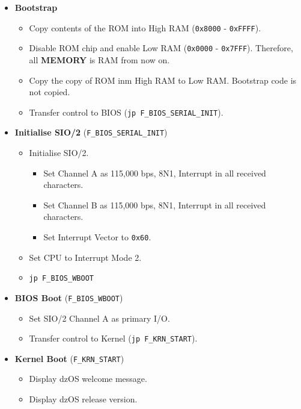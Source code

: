     \begin{itemize}
        \item \textbf{Bootstrap}
        \begin{itemize}
            \item Copy contents of the ROM into High RAM (\texttt{0x8000} - \texttt{0xFFFF}).
            \item Disable ROM chip and enable Low RAM (\texttt{0x0000} - \texttt{0x7FFF}).
            Therefore, all \textbf{MEMORY} is RAM from now on.
            \item Copy the copy of ROM inm High RAM to Low RAM. Bootstrap code is not copied.
            \item Transfer control to BIOS (\texttt{jp F\_BIOS\_SERIAL\_INIT}).
        \end{itemize}
        \item \textbf{Initialise SIO/2} (\texttt{F\_BIOS\_SERIAL\_INIT})
        \begin{itemize}
            \item Initialise SIO/2.
            \begin{itemize}
                \item Set Channel A as 115,000 bps, 8N1, Interrupt in all 
                received characters.
                \item Set Channel B as 115,000 bps, 8N1, Interrupt in all 
                received characters.
                \item Set Interrupt Vector to \texttt{0x60}.
            \end{itemize}
            \item Set CPU to Interrupt Mode 2.
            \item \texttt{jp F\_BIOS\_WBOOT}
        \end{itemize}
        \item \textbf{BIOS Boot} (\texttt{F\_BIOS\_WBOOT})
        \begin{itemize}
            \item Set SIO/2 Channel A as primary I/O.
            \item Transfer control to Kernel (\texttt{jp F\_KRN\_START}).
        \end{itemize}
        \item \textbf{Kernel Boot} (\texttt{F\_KRN\_START})
        \begin{itemize}
            \item Display dzOS welcome message.
            \item Display dzOS release version.

\end{itemize}
\end{itemize}
